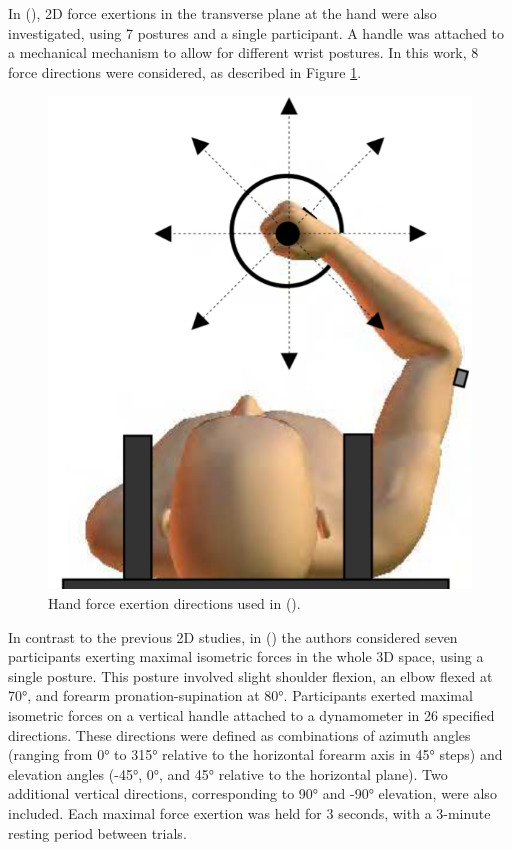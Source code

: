 In (\cite{sasakiHigherDimensionalSpatial2010a}), 2D force exertions in the transverse plane at the hand were also investigated, using 7 postures and a single participant. A handle was attached to a mechanical mechanism to allow for different wrist postures. In this work, 8 force directions were considered, as described in Figure \ref{fig:sasaki_foce}.
\begin{figure}[!htb]
    \captionsetup{justification=centering}
        \centering
        \includegraphics[trim={0 0 0 0},clip,width=0.4\linewidth]{img/chapter_1/sasaki_force.png}
    \caption{Hand force exertion directions used in (\cite{sasakiHigherDimensionalSpatial2010a}).}
    \label{fig:sasaki_foce}
\end{figure}

In contrast to the previous 2D studies, in (\cite{rezzougUpperLimbIsometricForce2021b}) the authors considered seven participants exerting maximal isometric forces in the whole 3D space, using a single posture. This posture involved slight shoulder flexion, an elbow flexed at 70°, and forearm pronation-supination at 80°. Participants exerted maximal isometric forces on a vertical handle attached to a dynamometer in 26 specified directions. These directions were defined as combinations of azimuth angles (ranging from 0° to 315° relative to the horizontal forearm axis in 45° steps) and elevation angles (-45°, 0°, and 45° relative to the horizontal plane). Two additional vertical directions, corresponding to 90° and -90° elevation, were also included. Each maximal force exertion was held for 3 seconds, with a 3-minute resting period between trials.

